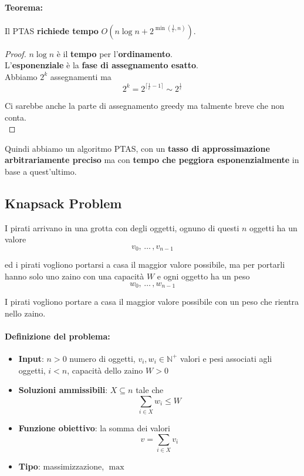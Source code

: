 \paragraph{Teorema:} Il PTAS \textbf{richiede tempo} $O\left(n \log n + 2^{\min \left(\frac{1}{\epsilon}, n\right)}\right)$.\\

\begin{proof}
	$n \log n$ è il \textbf{tempo} per l'\textbf{ordinamento}.\\
	
	L'\textbf{esponenziale} è la \textbf{fase di assegnamento esatto}.\\
	
	Abbiamo $2^k$ assegnamenti ma 
	$$ 2^k = 2^{\lceil \frac{1}{\epsilon} - 1\rceil} \sim 2^{\frac{1}{\epsilon}}$$
	
	Ci sarebbe anche la parte di assegnamento greedy ma talmente breve che non conta.\\
\end{proof}

Quindi abbiamo un algoritmo PTAS, con un \textbf{tasso di approssimazione arbitrariamente preciso} ma con \textbf{tempo che peggiora esponenzialmente} in base a quest'ultimo.\\

\newpage

\subsection{Knapsack Problem}

I pirati arrivano in una grotta con degli oggetti, ognuno di questi $n$ oggetti ha un valore 
$$ v_0, \, \dots \, , v_{n-1} $$

ed i pirati vogliono portarsi a casa il maggior valore possibile, ma per portarli hanno solo uno zaino con una capacità $W$ e ogni oggetto ha un peso  
$$ w_0, \, \dots \, , w_{n-1} $$

I pirati vogliono portare a casa il maggior valore possibile con un peso che rientra nello zaino.\\


\paragraph{Definizione del problema:}
\begin{itemize}
	\item \textbf{Input}: $n>0$ numero di oggetti, $v_i, w_i \in \mathbb{N}^+$ valori e pesi associati agli oggetti, $i <n$, capacità dello zaino $W>0$
	\item \textbf{Soluzioni ammissibili}: $X \subseteq n$ tale che 
	$$ \sum_{i \in X} w_i \leq W $$
	\item \textbf{Funzione obiettivo}: la somma dei valori 
	$$v = \sum_{i \in X} v_i$$
	\item \textbf{Tipo}: massimizzazione, $\max$
\end{itemize}

